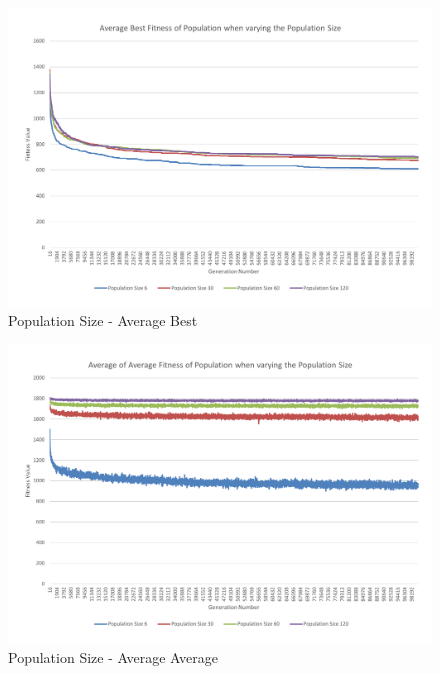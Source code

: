 \begin{figure}[thbp]
	\centerline{\includegraphics[width=\paperwidth]{figures/CircleTests/CircleTestsPopulationAverageBest.pdf}}
	\caption{Population Size - Average Best}
\end{figure}

\begin{figure}[thbp]
	\centerline{\includegraphics[width=\paperwidth]{figures/CircleTests/CircleTestsPopulationAverageAverage.pdf}}
	\caption{Population Size - Average Average}
\end{figure}

